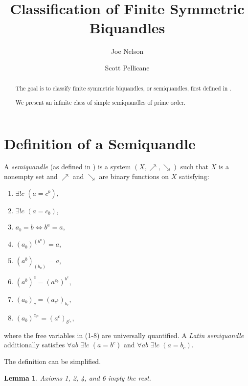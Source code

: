 \documentclass{amsart}
\newtheorem{lem}[thm]{Lemma}
\theoremstyle{definition}
\numberwithin{equation}{section}
\begin{document}
\title{Classification of Finite Symmetric Biquandles}

\author{Joe Nelson}
\author{Scott Pellicane}

\begin{abstract}
The goal is to classify finite symmetric biquandles, or semiquandles, first defined in \cite{aH10}.

We present an infinite class of simple semiquandles of prime order.
\end{abstract}

\maketitle


\section{Definition of a Semiquandle}

A \emph{semiquandle} (as defined in \cite{aH10}) is a system
$(X,\nearrow,\searrow)$ such that $X$ is a nonempty set and $\nearrow$
and $\searrow$ are binary functions on $X$ satisfying:

\begin{enumerate}
\item $\exists!{c}$ $(a = c^b)$,
\item $\exists!{c}$ $(a = c_b)$,
\item $a_b = b \Leftrightarrow b^a = a$,
\item $(a_b)^{(b^a)} = a$,
\item $(a^b)_{(b_a)} = a$,
\item $(a^b)^c = (a^{c_b})^{b^c}$,
\item $(a_b)_c = (a_{c^b})_{b_c}$,
\item $(a_b)^{c_{b^a}} = (a^c)_{b^{c_a}}$,
\end{enumerate}
where the free variables in (1-8) are universally quantified. A
\emph{Latin semiquandle} additionally satisfies $\forall{ab}$
$\exists!{c}$ $(a=b^c)$ and $\forall{ab}$ $\exists!{c}$ $(a=b_c)$.

The definition can be simplified.

\begin{lem}
Axioms 1, 2, 4, and 6 imply the rest.
\end{lem}
\end{document}
